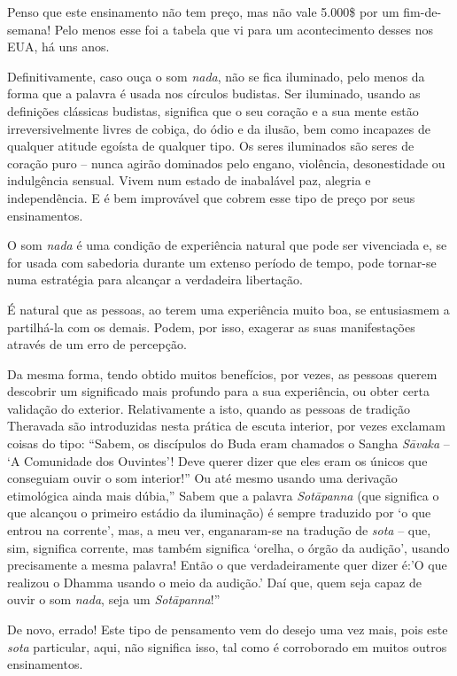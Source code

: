  Penso que este ensinamento não tem preço, mas não vale 5.000\$ por um
fim-de-semana! Pelo menos esse foi a tabela que vi para um acontecimento
desses nos EUA, há uns anos.

Definitivamente, caso ouça o som \emph{nada}, não se fica iluminado,
pelo menos da forma que a palavra é usada nos círculos budistas. Ser
iluminado, usando as definições clássicas budistas, significa que o seu
coração e a sua mente estão irreversivelmente livres de cobiça, do ódio
e da ilusão, bem como incapazes de qualquer atitude egoísta de qualquer
tipo. Os seres iluminados são seres de coração puro -- nunca agirão
dominados pelo engano, violência, desonestidade ou indulgência sensual.
Vivem num estado de inabalável paz, alegria e independência. E é bem
improvável que cobrem esse tipo de preço por seus ensinamentos.

O som \emph{nada} é uma condição de experiência natural que pode ser
vivenciada e, se for usada com sabedoria durante um extenso período de
tempo, pode tornar-se numa estratégia para alcançar a verdadeira
libertação.

É natural que as pessoas, ao terem uma experiência muito boa, se
entusiasmem a partilhá-la com os demais. Podem, por isso, exagerar as
suas manifestações através de um erro de percepção.

Da mesma forma, tendo obtido muitos benefícios, por vezes, as pessoas
querem descobrir um significado mais profundo para a sua experiência, ou
obter certa validação do exterior. Relativamente a isto, quando as
pessoas de tradição Theravada são introduzidas nesta prática de escuta
interior, por vezes exclamam coisas do tipo: ``Sabem, os discípulos do
Buda eram chamados o Sangha \emph{Sāvaka} -- `A Comunidade dos
Ouvintes'! Deve querer dizer que eles eram os únicos que conseguiam
ouvir o som interior!'' Ou até mesmo usando uma derivação etimológica
ainda mais dúbia,'' Sabem que a palavra \emph{Sotāpanna} (que significa
o que alcançou o primeiro estádio da iluminação) é sempre traduzido por
`o que entrou na corrente', mas, a meu ver, enganaram-se na tradução de
\emph{sota} -- que, sim, significa corrente, mas também significa
`orelha, o órgão da audição', usando precisamente a mesma palavra! Então
o que verdadeiramente quer dizer é:'O que realizou o Dhamma usando o
meio da audição.' Daí que, quem seja capaz de ouvir o som \emph{nada},
seja um \emph{Sotāpanna}!''

De novo, errado! Este tipo de pensamento vem do desejo uma vez mais,
pois este \emph{sota} particular, aqui, não significa isso, tal como é
corroborado em muitos outros ensinamentos.\cite{ensinamentos}

